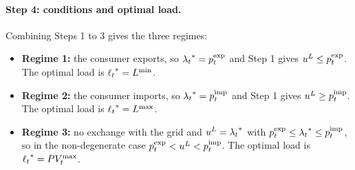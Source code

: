 \paragraph{Step 4: conditions and optimal load.}
Combining Steps 1 to 3 gives the three regimes:
\begin{itemize}
    \item \textbf{Regime 1:} the consumer exports, so ${\lambda_{t}}^* = p^{\mathrm{exp}}_{t}$ and Step 1 gives
    $u^{L} \leq p^{\mathrm{exp}}_{t}$. The optimal load is ${\ell_{t}}^* = L^{\min}$.
    \item \textbf{Regime 2:} the consumer imports, so ${\lambda_{t}}^* = p^{\mathrm{imp}}_{t}$ and Step 1 gives
    $u^{L} \geq p^{\mathrm{imp}}_{t}$. The optimal load is ${\ell_{t}}^* = L^{\max}$.
    \item \textbf{Regime 3:} no exchange with the grid and $u^{L} = {\lambda_{t}}^*$ with
    $p^{\mathrm{exp}}_{t} \leq {\lambda_{t}}^* \leq p^{\mathrm{imp}}_{t}$, so in the non-degenerate case
    $p^{\mathrm{exp}}_{t} < u^{L} < p^{\mathrm{imp}}_{t}$. The optimal load is ${\ell_{t}}^* = PV_{t}^{\max}$.
\end{itemize}


